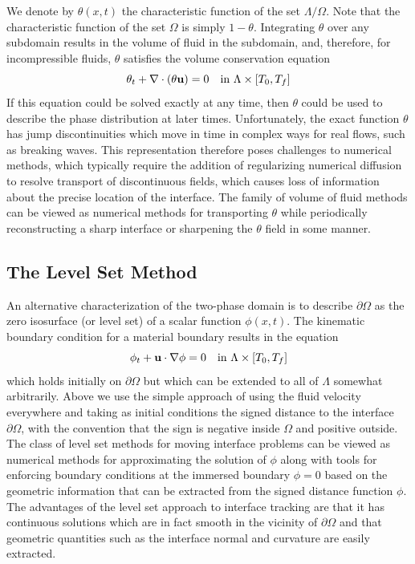 \documentclass[letterpaper]{erdc}
\begin{document}
We denote by $\theta(x,t)$ the characteristic function of the set
$\Lambda/\Omega$. Note that the characteristic function of the set $\Omega$ is
simply $1-\theta$. Integrating $\theta$ over any subdomain results in the
volume of fluid in the subdomain, and, therefore, for incompressible
fluids, $\theta$ satisfies the volume conservation equation
\begin{equation}
    \theta_t + \nabla\cdot\left( \theta \textbf{u}\right) = 0 \quad \mbox{in }\Lambda\times[T_0,T_f]
\end{equation}
If this equation could be solved exactly at any time, then $\theta$ could be
used to describe the phase distribution at later times. Unfortunately, the
exact function $\theta$ has jump discontinuities which move in time in complex
ways for real flows, such as breaking waves. This representation therefore
poses challenges to numerical methods, which typically require the addition
of regularizing numerical diffusion to resolve transport of discontinuous
fields, which causes loss of information about the precise location of the
interface.  The family of volume of fluid methods can be viewed as numerical
methods for transporting $\theta$ while periodically reconstructing a sharp
interface or sharpening the $\theta$ field in some manner.

\subsection{The Level Set Method}\label{sec:LevelSetMethod}

An alternative characterization of the two-phase domain is to describe
$\partial \Omega$ as the zero isosurface (or level set) of a scalar function
$\phi(x,t)$. The kinematic boundary condition for a material boundary results
in the equation
\begin{equation}\label{eqn:variabledensityequation}
    \phi_t + \textbf{u} \cdot \nabla \phi = 0 \quad  \mbox{in }\Lambda\times[T_0,T_f]
\end{equation}
which holds initially on $\partial \Omega$ but which can be extended to all of
$\Lambda$ somewhat arbitrarily. Above we use the simple approach of using the
fluid velocity everywhere and taking as initial conditions the signed distance
to the interface $\partial \Omega$, with the convention that the sign is
negative inside $\Omega$ and positive outside. The class of level set methods
for moving interface problems can be viewed as numerical methods for
approximating the solution of $\phi$ along with tools for enforcing boundary
conditions at the immersed boundary $\phi=0$ based on the geometric information
that can be extracted from the signed distance function $\phi$.  The advantages
of the level set approach to interface tracking are that it has continuous
solutions which are in fact smooth in the vicinity of $\partial \Omega$ and
that geometric quantities such as the interface normal and curvature are easily
extracted.
\end{document}
